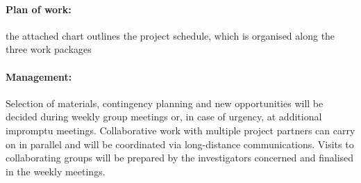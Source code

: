 

\paragraph{Plan of work:} the attached chart outlines the project schedule, which is organised along the three work packages 

\paragraph{Management:} 
Selection of materials, contingency planning and new
opportunities will be decided during weekly group meetings or,
in case of urgency, at additional impromptu meetings.  Collaborative
work with multiple project partners can carry on in parallel and will
be coordinated via long-distance communications. 
Visits to collaborating groups will be
prepared by the investigators concerned and finalised in the weekly 
meetings.

